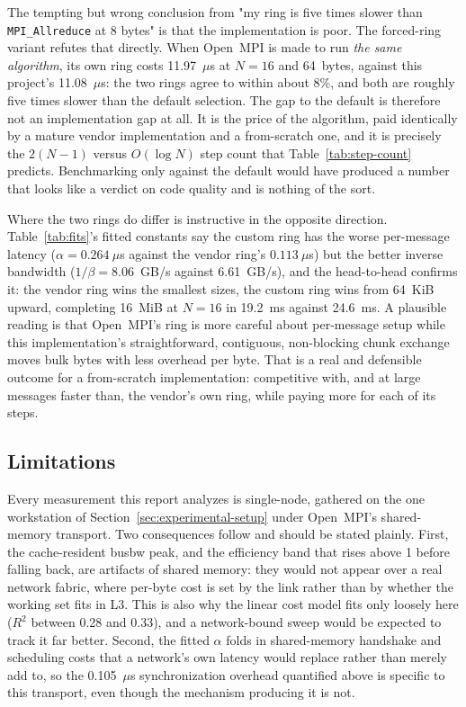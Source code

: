 The tempting but wrong conclusion from "my ring is five times slower than \texttt{MPI\_Allreduce} at 8 bytes" is that the implementation is poor. The forced-ring variant refutes that directly. When Open~MPI is made to run \emph{the same algorithm}, its own ring costs 11.97~$\mu$s at $N=16$ and 64~bytes, against this project's 11.08~$\mu$s: the two rings agree to within about 8\%, and both are roughly five times slower than the default selection. The gap to the default is therefore not an implementation gap at all. It is the price of the algorithm, paid identically by a mature vendor implementation and a from-scratch one, and it is precisely the $2(N-1)$ versus $O(\log N)$ step count that Table~\ref{tab:step-count} predicts. Benchmarking only against the default would have produced a number that looks like a verdict on code quality and is nothing of the sort.

Where the two rings do differ is instructive in the opposite direction. Table~\ref{tab:fits}'s fitted constants say the custom ring has the worse per-message latency ($\alpha = 0.264~\mu$s against the vendor ring's $0.113~\mu$s) but the better inverse bandwidth ($1/\beta = 8.06$~GB/s against 6.61~GB/s), and the head-to-head confirms it: the vendor ring wins the smallest sizes, the custom ring wins from 64~KiB upward, completing 16~MiB at $N=16$ in 19.2~ms against 24.6~ms. A plausible reading is that Open~MPI's ring is more careful about per-message setup while this implementation's straightforward, contiguous, non-blocking chunk exchange moves bulk bytes with less overhead per byte. That is a real and defensible outcome for a from-scratch implementation: competitive with, and at large messages faster than, the vendor's own ring, while paying more for each of its steps.

\subsection{Limitations}

Every measurement this report analyzes is single-node, gathered on the one workstation of Section~\ref{sec:experimental-setup} under Open~MPI's shared-memory transport. Two consequences follow and should be stated plainly. First, the cache-resident busbw peak, and the efficiency band that rises above 1 before falling back, are artifacts of shared memory: they would not appear over a real network fabric, where per-byte cost is set by the link rather than by whether the working set fits in L3. This is also why the linear cost model fits only loosely here ($R^2$ between 0.28 and 0.33), and a network-bound sweep would be expected to track it far better. Second, the fitted $\alpha$ folds in shared-memory handshake and scheduling costs that a network's own latency would replace rather than merely add to, so the 0.105~$\mu$s synchronization overhead quantified above is specific to this transport, even though the mechanism producing it is not.

